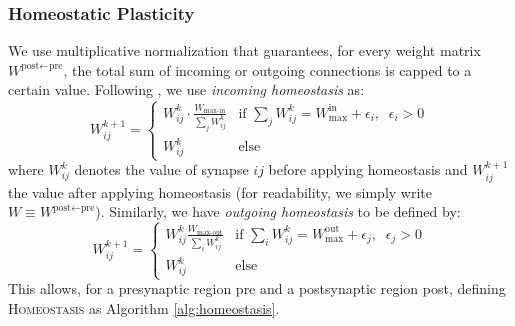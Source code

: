 \documentclass{article}
\begin{document}
\subsubsection*{Homeostatic Plasticity}
We use multiplicative normalization that guarantees, for every weight matrix $W^{\textrm{post}\leftarrow\textrm{pre}}$, the total sum of incoming or outgoing connections is capped to a certain value. Following , we use \textit{incoming homeostasis} as:
\begin{equation}
W_{ij}^{k+1}=
\begin{cases}
 W_{ij}^{k}\cdot\frac{W_\textrm{max-in}}{\sum_{j}W^{k}_{ij}} & \text{if }\sum_{j}W^{k}_{ij} = W_\textrm{max}^\textrm{in} + \epsilon_i, \;\; \epsilon_i > 0 \\[1.2ex]
W^k_{ij}& \textrm{else}
\end{cases}
\end{equation}
where $W^k_{ij}$ denotes the value of synapse $ij$ before applying homeostasis and $W^{k+1}_{ij}$ the value after applying homeostasis (for readability, we simply write $W \equiv W^{\textrm{post}\leftarrow\textrm{pre}}$).
Similarly, we have \textit{outgoing homeostasis} to be defined by:
\begin{equation}
W_{ij}^{k+1} =
\begin{cases}
  W_{ij}^{k}\frac{W_\textrm{max-out}}{\sum_{i}W^k_{ij}} & \text{if }\sum_{i}W^k_{ij} = W_\textrm{max}^\textrm{out} + \epsilon_j, \;\; \epsilon_j > 0 \\[1.2ex]
W^k_{ij} & \textrm{else}
\end{cases}
\end{equation}
This allows, for a presynaptic region pre and a postsynaptic region post, defining \textsc{Homeostasis} as Algorithm \ref{alg:homeostasis}.
\end{document}

